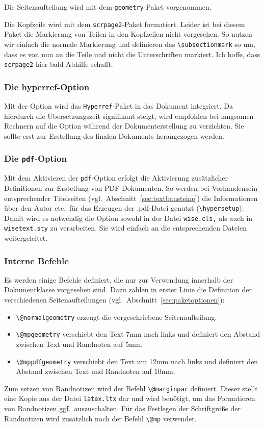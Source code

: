 \documentclass[english, trackchanges, hyperref, ngerman ,pdf, mp, mppdf]{wise}
\newcommand\code[1]{\texttt{#1}}
\newcommand\command[1]{\code{\textbackslash{}#1}}
\begin{document}
Die Seitenaufteilung wird mit dem \code{geometry}-Paket vorgenommen.

Die Kopfzeile wird mit dem \code{scrpage2}-Paket formatiert. Leider
ist bei diesem Paket die Markierung von Teilen in den Kopfzeilen nicht
vorgesehen. So nutzen wir einfach die normale Markierung und definieren
das \command{subsectionmark} so um, dass es von nun
an die Teile und nicht die Unterschriften markiert. Ich hoffe, dass
\code{scrpage2} hier bald Abhilfe schafft.


\subsubsection{Die hyperref-Option}

Mit der Option wird das \code{Hyperref}-Paket in das Dokument integriert.
Da hierdurch die Übersetzungszeit signifikant steigt, wird empfohlen
bei langsamen Rechnern auf die Option während der Dokumenterstellung
zu verzichten. Sie sollte erst zur Erstellung des finalen Dokuments
herangezogen werden.


\subsubsection{Die \code{pdf}-Option}

Mit dem Aktivieren der \code{pdf}-Option erfolgt die Aktivierung
zusätzlicher Definitionen zur Erstellung von PDF-Dokumenten. So werden
bei Vorhandensein entsprechender Titelseiten (vgl.\ Abschnitt~\ref{sec:textbausteine})
die Informationen über den Autor etc.\ für das Erzeugen der .pdf-Datei
genutzt (\command{hypersetup}). Damit wird es notwendig
die Option sowohl in der Datei \code{wise.cls,} als auch in \code{wisetext.sty}
zu verarbeiten. Sie wird einfach an die entsprechenden Dateien weitergeleitet.


\subsubsection{Interne Befehle}\label{sec:interne_befehle}

Es werden einige Befehle definiert, die nur zur Verwendung innerhalb
der Dokumentklasse vorgesehen sind. Dazu zählen in erster Linie die
Definition der verschiedenen Seitenaufteilungen (vgl.~Abschnitt~\ref{sec:paketoptionen}):

\begin{itemize}
\item \command{@normalgeometry} erzeugt die vorgeschriebene
Seitenaufteilung.
\item \command{@mpgeometry} verschiebt den Text 7mm nach
links und definiert den Abstand zwischen Text und Randnoten auf 5mm.
\item \command{@mppdfgeometry} verschiebt den Text um 12mm
nach links und definiert den Abstand zwischen Text und Randnoten auf
10mm.
\end{itemize}
Zum setzen von Randnotizen wird der Befehl \command{@marginpar}
definiert. Dieser stellt eine Kopie aus der Datei \code{latex.ltx}
dar und wird benötigt, um das Formatieren von Randnotizen ggf.\ auszuschalten.
Für das Festlegen der Schriftgröße der Randnotizen wird zusätzlich
noch der Befehl \command{@mp} verwendet.
\end{document}
